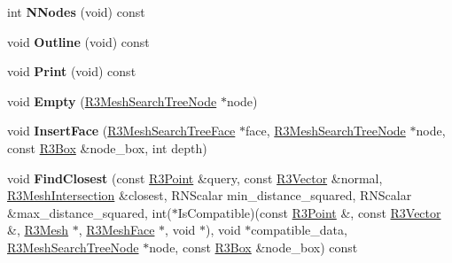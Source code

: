 \begin{DoxyCompactItemize}
\item 
int {\bfseries N\+Nodes} (void) const \hypertarget{class_r3_mesh_search_tree_a088a80a3e33b50e92f269f82450b1127}{}\label{class_r3_mesh_search_tree_a088a80a3e33b50e92f269f82450b1127}

\item 
void {\bfseries Outline} (void) const \hypertarget{class_r3_mesh_search_tree_a7b19af042d37610142c4829c63a99d78}{}\label{class_r3_mesh_search_tree_a7b19af042d37610142c4829c63a99d78}

\item 
void {\bfseries Print} (void) const \hypertarget{class_r3_mesh_search_tree_a4a6d7cdfe6ac17433a75ef3f84512c73}{}\label{class_r3_mesh_search_tree_a4a6d7cdfe6ac17433a75ef3f84512c73}

\item 
void {\bfseries Empty} (\hyperlink{class_r3_mesh_search_tree_node}{R3\+Mesh\+Search\+Tree\+Node} $\ast$node)\hypertarget{class_r3_mesh_search_tree_ad600e4d169ac1be45a66f97997afb65a}{}\label{class_r3_mesh_search_tree_ad600e4d169ac1be45a66f97997afb65a}

\item 
void {\bfseries Insert\+Face} (\hyperlink{class_r3_mesh_search_tree_face}{R3\+Mesh\+Search\+Tree\+Face} $\ast$face, \hyperlink{class_r3_mesh_search_tree_node}{R3\+Mesh\+Search\+Tree\+Node} $\ast$node, const \hyperlink{class_r3_box}{R3\+Box} \&node\+\_\+box, int depth)\hypertarget{class_r3_mesh_search_tree_afefe018a9d4a2ce6f9b715319d1b1ea8}{}\label{class_r3_mesh_search_tree_afefe018a9d4a2ce6f9b715319d1b1ea8}

\item 
void {\bfseries Find\+Closest} (const \hyperlink{class_r3_point}{R3\+Point} \&query, const \hyperlink{class_r3_vector}{R3\+Vector} \&normal, \hyperlink{struct_r3_mesh_intersection}{R3\+Mesh\+Intersection} \&closest, R\+N\+Scalar min\+\_\+distance\+\_\+squared, R\+N\+Scalar \&max\+\_\+distance\+\_\+squared, int($\ast$Is\+Compatible)(const \hyperlink{class_r3_point}{R3\+Point} \&, const \hyperlink{class_r3_vector}{R3\+Vector} \&, \hyperlink{class_r3_mesh}{R3\+Mesh} $\ast$, \hyperlink{class_r3_mesh_face}{R3\+Mesh\+Face} $\ast$, void $\ast$), void $\ast$compatible\+\_\+data, \hyperlink{class_r3_mesh_search_tree_node}{R3\+Mesh\+Search\+Tree\+Node} $\ast$node, const \hyperlink{class_r3_box}{R3\+Box} \&node\+\_\+box) const \hypertarget{class_r3_mesh_search_tree_aec2b5de7093b6257b2d39001f2cd5cca}{}\label{class_r3_mesh_search_tree_aec2b5de7093b6257b2d39001f2cd5cca}


\end{DoxyCompactItemize}
